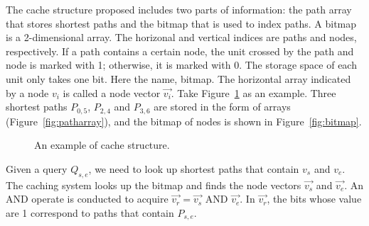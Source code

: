 The cache structure proposed includes two parts of information: the path array that stores shortest paths and the bitmap that is used to index paths.
A bitmap is a 2-dimensional array.
The horizonal and vertical indices are paths and nodes, respectively.
If a path contains a certain node, the unit crossed by the path and node is marked with 1; otherwise, it is marked with 0.
The storage space of each unit only takes one bit. Here the name, bitmap.
The horizontal array indicated by a node $v_i$ is called a node vector $\vec{v_i}$.
Take Figure~\ref{fig:cache_structure} as an example. Three shortest paths $P_{0,5}$, $P_{2,4}$ and $P_{3,6}$ are stored in the form of arrays (Figure~\ref{fig:patharray}), and the bitmap of nodes is shown in Figure~\ref{fig:bitmap}.

\begin{figure}[htbp]
\centering
 \caption{An example of cache structure.}
 \label{fig:cache_structure}
\end{figure}



Given a query $Q_{s,e}$, we need to look up shortest paths that contain $v_s$ and $v_e$. The caching system looks up the bitmap and finds the node vectors $\vec{v_s}$ and $\vec{v_e}$. An AND operate is conducted to acquire $\vec{v_r}=\vec{v_s}$ AND $\vec{v_e}$. In $\vec{v_r}$, the bits whose value are 1 correspond to paths that contain $P_{s,e}$.

